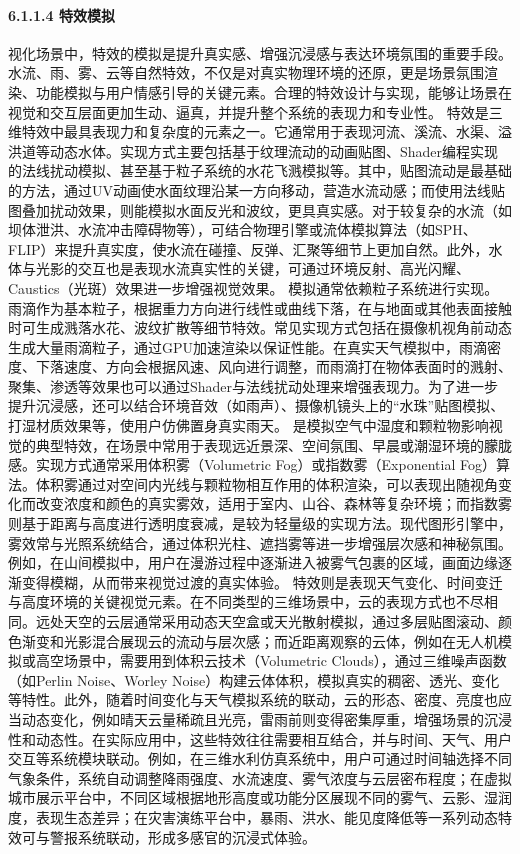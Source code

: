 {{\paragraph{6.1.1.4 特效模拟}\label{ux7279ux6548ux6a21ux62df}
视化场景中，特效的模拟是提升真实感、增强沉浸感与表达环境氛围的重要手段。水流、雨、雾、云等自然特效，不仅是对真实物理环境的还原，更是场景氛围渲染、功能模拟与用户情感引导的关键元素。合理的特效设计与实现，能够让场景在视觉和交互层面更加生动、逼真，并提升整个系统的表现力和专业性。
特效是三维特效中最具表现力和复杂度的元素之一。它通常用于表现河流、溪流、水渠、溢洪道等动态水体。实现方式主要包括基于纹理流动的动画贴图、Shader编程实现的法线扰动模拟、甚至基于粒子系统的水花飞溅模拟等。其中，贴图流动是最基础的方法，通过UV动画使水面纹理沿某一方向移动，营造水流动感；而使用法线贴图叠加扰动效果，则能模拟水面反光和波纹，更具真实感。对于较复杂的水流（如坝体泄洪、水流冲击障碍物等），可结合物理引擎或流体模拟算法（如SPH、FLIP）来提升真实度，使水流在碰撞、反弹、汇聚等细节上更加自然。此外，水体与光影的交互也是表现水流真实性的关键，可通过环境反射、高光闪耀、Caustics（光斑）效果进一步增强视觉效果。
模拟通常依赖粒子系统进行实现。雨滴作为基本粒子，根据重力方向进行线性或曲线下落，在与地面或其他表面接触时可生成溅落水花、波纹扩散等细节特效。常见实现方式包括在摄像机视角前动态生成大量雨滴粒子，通过GPU加速渲染以保证性能。在真实天气模拟中，雨滴密度、下落速度、方向会根据风速、风向进行调整，而雨滴打在物体表面时的溅射、聚集、渗透等效果也可以通过Shader与法线扰动处理来增强表现力。为了进一步提升沉浸感，还可以结合环境音效（如雨声）、摄像机镜头上的``水珠''贴图模拟、打湿材质效果等，使用户仿佛置身真实雨天。
是模拟空气中湿度和颗粒物影响视觉的典型特效，在场景中常用于表现远近景深、空间氛围、早晨或潮湿环境的朦胧感。实现方式通常采用体积雾（Volumetric Fog）或指数雾（Exponential
Fog）算法。体积雾通过对空间内光线与颗粒物相互作用的体积渲染，可以表现出随视角变化而改变浓度和颜色的真实雾效，适用于室内、山谷、森林等复杂环境；而指数雾则基于距离与高度进行透明度衰减，是较为轻量级的实现方法。现代图形引擎中，雾效常与光照系统结合，通过体积光柱、遮挡雾等进一步增强层次感和神秘氛围。例如，在山间模拟中，用户在漫游过程中逐渐进入被雾气包裹的区域，画面边缘逐渐变得模糊，从而带来视觉过渡的真实体验。
特效则是表现天气变化、时间变迁与高度环境的关键视觉元素。在不同类型的三维场景中，云的表现方式也不尽相同。远处天空的云层通常采用动态天空盒或天光散射模拟，通过多层贴图滚动、颜色渐变和光影混合展现云的流动与层次感；而近距离观察的云体，例如在无人机模拟或高空场景中，需要用到体积云技术（Volumetric
Clouds），通过三维噪声函数（如Perlin Noise、Worley
Noise）构建云体体积，模拟真实的稠密、透光、变化等特性。此外，随着时间变化与天气模拟系统的联动，云的形态、密度、亮度也应当动态变化，例如晴天云量稀疏且光亮，雷雨前则变得密集厚重，增强场景的沉浸性和动态性。在实际应用中，这些特效往往需要相互结合，并与时间、天气、用户交互等系统模块联动。例如，在三维水利仿真系统中，用户可通过时间轴选择不同气象条件，系统自动调整降雨强度、水流速度、雾气浓度与云层密布程度；在虚拟城市展示平台中，不同区域根据地形高度或功能分区展现不同的雾气、云影、湿润度，表现生态差异；在灾害演练平台中，暴雨、洪水、能见度降低等一系列动态特效可与警报系统联动，形成多感官的沉浸式体验。
}}
